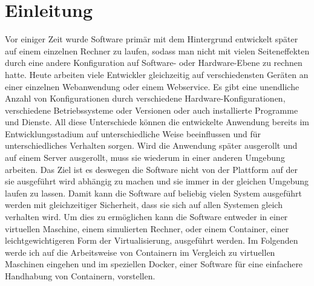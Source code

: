 \chapter{Einleitung}

Vor einiger Zeit wurde Software primär mit dem Hintergrund entwickelt später auf einem einzelnen Rechner zu laufen, sodass man nicht mit vielen Seiteneffekten durch eine andere Konfiguration auf Software- oder Hardware-Ebene zu rechnen hatte. Heute arbeiten viele Entwickler gleichzeitig auf verschiedensten Geräten an einer einzelnen Webanwendung oder einem Webservice. Es gibt eine unendliche Anzahl von Konfigurationen durch verschiedene Hardware-Konfigurationen, verschiedene Betriebssysteme oder Versionen oder auch installierte Programme und Dienste. All diese Unterschiede können die entwickelte Anwendung bereits im Entwicklungsstadium auf unterschiedliche Weise beeinflussen und für unterschiedliches Verhalten sorgen. Wird die Anwendung später ausgerollt und auf einem Server ausgerollt, muss sie wiederum in einer anderen Umgebung arbeiten. Das Ziel ist es deswegen die Software nicht von der Plattform auf der sie ausgeführt wird abhängig zu machen und sie immer in der gleichen Umgebung laufen zu lassen. Damit kann die Software auf beliebig vielen System ausgeführt werden mit gleichzeitiger Sicherheit, dass sie sich auf allen Systemen gleich verhalten wird. Um dies zu ermöglichen kann die Software entweder in einer virtuellen Maschine, einem simulierten Rechner, oder einem Container, einer leichtgewichtigeren Form der Virtualisierung, ausgeführt werden. Im Folgenden werde ich auf die Arbeitsweise von Containern im Vergleich zu virtuellen Maschinen eingehen und im speziellen Docker, einer Software für eine einfachere Handhabung von Containern, vorstellen.
